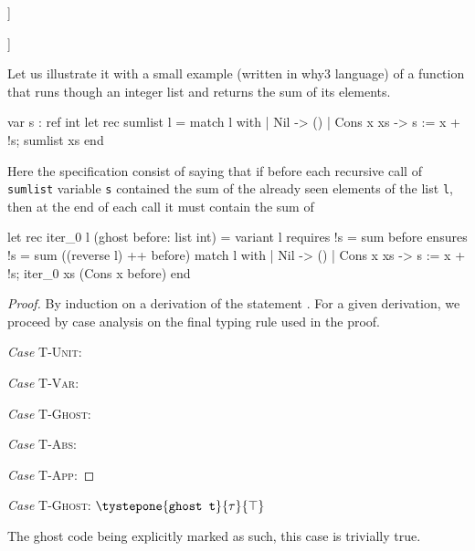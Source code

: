 		{\tstep{\Gamma}{\varepsilon x}{\sigma[\overline{\alpha}} \mapsfrom \overline{\tau}]}

		{\tstep{\Gamma}{\texttt{op}}{\sigma[\overline{\alpha}} \mapsfrom \overline{\tau}]}
		
		
Let us illustrate it with a small example (written in why3 language) 
 of a function that runs though an integer list  and returns the sum of its elements.   
	\begin{whycode}   
var s : ref int
let rec sumlist l =
    match l with
      | Nil -> ()
      | Cons x xs -> s := x + !s; sumlist xs 
    end
    \end{whycode}
Here the specification consist of saying that if before each recursive call of \texttt{sumlist} 
variable \texttt{s} contained the sum of the already seen elements of the list \texttt{l},
then at the end of each call it must contain the sum of 

 \begin{whycode}
let rec iter_0 l (ghost before: list int) =
    variant  { l }
    requires { !s = sum before }
    ensures  { !s = sum ((reverse l) ++ before) }
    match l with
      | Nil -> ()
      | Cons x xs -> s := x + !s; iter_0 xs (Cons x before)
    end

  \end{whycode}
 \begin{proof}
By induction on a derivation of the statement 
. 
For a given derivation, we proceed by case analysis on the final typing rule used in the
 proof.
 
 	\textit{Case} \textsc{T-Unit}:\quad
 	
 	\textit{Case} \textsc{T-Var}:\quad
 	
 	\textit{Case} \textsc{T-Ghost}:\quad
 	
 	\textit{Case} \textsc{T-Abs}:\quad
 	
 	\textit{Case} \textsc{T-App}:\quad
\end{proof}


	\noindent\textit{Case} \textsc{T-Ghost}:\quad 
 	$\tystepone{\texttt{ghost t}}{\tau}{\top}$ 
 	
 	The ghost code being explicitly marked as such, this case is trivially true. 